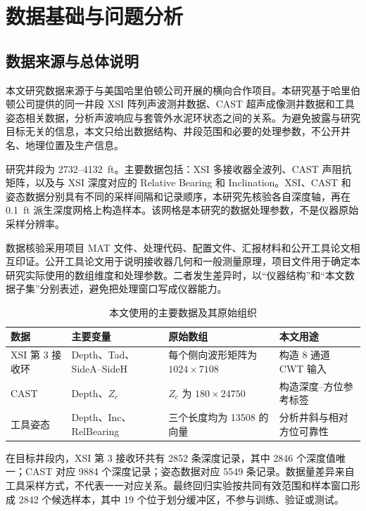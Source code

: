 \chapter{数据基础与问题分析}

\section{数据来源与总体说明}

本文研究数据来源于与美国哈里伯顿公司开展的横向合作项目。本研究基于哈里伯顿公司提供的同一井段 XSI 阵列声波测井数据、CAST 超声成像测井数据和工具姿态相关数据，分析声波响应与套管外水泥环状态之间的关系。为避免披露与研究目标无关的信息，本文只给出数据结构、井段范围和必要的处理参数，不公开井名、地理位置及生产信息。

研究井段为 2732--4132~ft。主要数据包括：XSI 多接收器全波列、CAST 声阻抗矩阵，以及与 XSI 深度对应的 Relative Bearing 和 Inclination。XSI、CAST 和姿态数据分别具有不同的采样间隔和记录顺序，本研究先核验各自深度轴，再在 0.1~ft 派生深度网格上构造样本。该网格是本研究的数据处理参数，不是仪器原始采样分辨率。

数据核验采用项目 MAT 文件、处理代码、配置文件、汇报材料和公开工具论文相互印证。公开工具论文用于说明接收器几何和一般测量原理，项目文件用于确定本研究实际使用的数组维度和处理参数。二者发生差异时，以“仪器结构”和“本文数据子集”分别表述，避免把处理窗口写成仪器能力。

\begin{table}[htbp]
  \centering
  \small
  \setlength{\tabcolsep}{4pt}
  \caption{本文使用的主要数据及其原始组织}
  \label{tab:data-overview}
  \begin{tabular}{p{}p{}p{}p{}}
    \toprule
    数据 & 主要变量 & 原始数组 & 本文用途 \\
    \midrule
    XSI 第 3 接收环 & Depth、Tad、SideA--SideH & 每个侧向波形矩阵为 $1024\times7108$ & 构造 8 通道 CWT 输入 \\
    CAST & Depth、$Z_c$ & $Z_c$ 为 $180\times24750$ & 构造深度--方位参考标签 \\
    工具姿态 & Depth、Inc、RelBearing & 三个长度均为 13508 的向量 & 分析井斜与相对方位可靠性 \\
    \bottomrule
  \end{tabular}
\end{table}

在目标井段内，XSI 第 3 接收环共有 2852 条深度记录，其中 2846 个深度值唯一；CAST 对应 9884 个深度记录；姿态数据对应 5549 条记录。数据量差异来自工具采样方式，不代表一一对应关系。最终回归实验按共同有效范围和样本窗口形成 2842 个候选样本，其中 19 个位于划分缓冲区，不参与训练、验证或测试。

